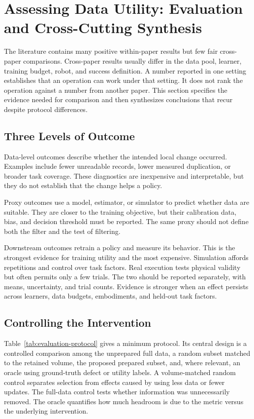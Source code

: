 \section{Assessing Data Utility: Evaluation and Cross-Cutting Synthesis}
\label{sec:evaluation}

The literature contains many positive within-paper results but few fair cross-paper comparisons.
Cross-paper results usually differ in the data pool, learner, training budget, robot, and success definition.
A number reported in one setting establishes that an operation can work under that setting.
It does not rank the operation against a number from another paper.
This section specifies the evidence needed for comparison and then synthesizes conclusions that recur despite protocol differences.

\subsection{Three Levels of Outcome}

Data-level outcomes describe whether the intended local change occurred.
Examples include fewer unreadable records, lower measured duplication, or broader task coverage.
These diagnostics are inexpensive and interpretable, but they do not establish that the change helps a policy.

Proxy outcomes use a model, estimator, or simulator to predict whether data are suitable.
They are closer to the training objective, but their calibration data, bias, and decision threshold must be reported.
The same proxy should not define both the filter and the test of filtering.

Downstream outcomes retrain a policy and measure its behavior.
This is the strongest evidence for training utility and the most expensive.
Simulation affords repetitions and control over task factors.
Real execution tests physical validity but often permits only a few trials.
The two should be reported separately, with means, uncertainty, and trial counts.
Evidence is stronger when an effect persists across learners, data budgets, embodiments, and held-out task factors.



\subsection{Controlling the Intervention}

Table~\ref{tab:evaluation-protocol} gives a minimum protocol.
Its central design is a controlled comparison among the unprepared full data, a random subset matched to the retained volume, the proposed prepared subset, and, where relevant, an oracle using ground-truth defect or utility labels.
A volume-matched random control separates selection from effects caused by using less data or fewer updates.
The full-data control tests whether information was unnecessarily removed.
The oracle quantifies how much headroom is due to the metric versus the underlying intervention.

